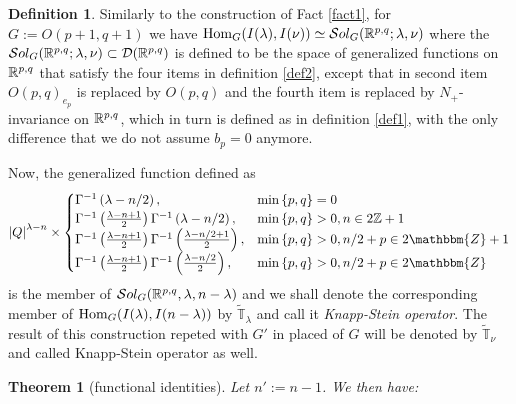 \documentclass[10pt]{article} %
\newtheorem{theorem}{Theorem}
\newcommand{\Hom}{\mbox{\normalfont Hom}}
\newcommand{\Sol}{\mathcal{S}ol}
\theoremstyle{definition}
\newtheorem{definition}{Definition}
\begin{document}
	\begin{definition}
		Similarly to the construction of Fact \ref{fact1}, for $G:=O(p+1,q+1)$ we have $\Hom_G(I(\lambda),I(\nu))\simeq\Sol_G(\R^{p,q};\lambda,\nu)$
		where the $\Sol_G(\R^{p,q};\lambda,\nu)\subset\mathcal{D}(\R^{p,q})$ is defined to be the space of generalized functions on $\mathbb{R}^{p,q}$ that satisfy
		the four items in definition \ref{def2}, except that in second item $O(p,q)_{e_p}$ is replaced by $O(p,q)$ and the fourth item is replaced by $N_+$-invariance
		on $\mathbb{R}^{p,q}$, which in turn is defined as in definition \ref{def1}, with the only difference that we do not assume $b_p=0$ anymore.

		Now, the generalized function defined as
		\begin{equation*}
			\myabs{Q}^{\lambda-n}\times\begin{cases}
				\Gamma^{-1}\left( \lambda-n/2 \right),&\min\left\{ p,q \right\}=0\\
				\Gamma^{-1}\left( \frac{\lambda-n+1}{2} \right)\Gamma^{-1}\left( \lambda-n/2 \right),&\min\left\{ p,q \right\}>0,n\in2\Z+1\\
  \Gamma^{-1} \left( \frac{\lambda-n + 1}{2} \right) \Gamma ^{-1}\left( \frac{\lambda-n/2+
  1}{2} \right), &\min\left\{ p,q \right\}>0, n / 2 + p \in 2\mathbbm{Z}+ 1\\
  \Gamma^{-1} \left( \frac{\lambda-n + 1}{2} \right) \Gamma ^{-1}\left( \frac{\lambda-n/2}{2}
  \right), & \min\left\{ p,q \right\}>0,n / 2 + p \in 2\mathbbm{Z}
			\end{cases}
		\end{equation*}
		is the member of $\Sol_G(\R^{p,q},\lambda,n-\lambda)$ and we shall denote the corresponding member of $\Hom_{G}(I(\lambda),I(n-\lambda))$ by $\tilde{\mathbb{T}}_{\lambda}$
		and call it \textit{Knapp-Stein operator}.
		The result of this construction repeted with $G'$ in placed of $G$ will be denoted by $\tilde{\mathbb{T}}_\nu$ and called Knapp-Stein operator as well.
	\end{definition}
	\begin{theorem}[functional identities]
		Let $n':=n-1$. We then have:
	\end{theorem}
\end{document}
